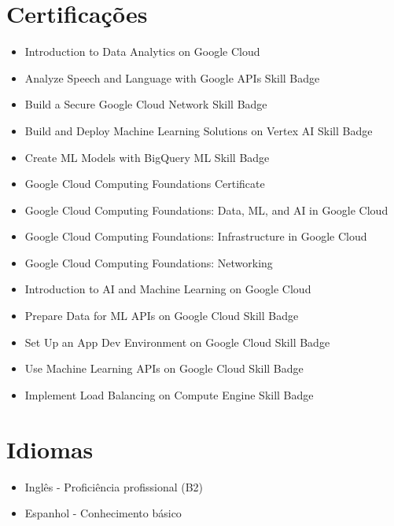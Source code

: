 \documentclass[letterpaper,11pt]{article}
\newcommand{\resumeItem}[1]{
  \item\small{
    {#1 \vspace{-2pt}}
  }
}
\newcommand{\resumeSubHeadingListStart}{\begin{itemize}[leftmargin=0.0in, label={}]}
\newcommand{\resumeSubHeadingListEnd}{\end{itemize}}
\begin{document}
\section{Certificações}
  \resumeSubHeadingListStart
    \resumeItem{Introduction to Data Analytics on Google Cloud}
    \resumeItem{Analyze Speech and Language with Google APIs Skill Badge}
    \resumeItem{Build a Secure Google Cloud Network Skill Badge}
    \resumeItem{Build and Deploy Machine Learning Solutions on Vertex AI Skill Badge}
    \resumeItem{Create ML Models with BigQuery ML Skill Badge}
    \resumeItem{Google Cloud Computing Foundations Certificate}
    \resumeItem{Google Cloud Computing Foundations: Data, ML, and AI in Google Cloud}
    \resumeItem{Google Cloud Computing Foundations: Infrastructure in Google Cloud}
    \resumeItem{Google Cloud Computing Foundations: Networking }
    \resumeItem{Introduction to AI and Machine Learning on Google Cloud}
    \resumeItem{Prepare Data for ML APIs on Google Cloud Skill Badge}
    \resumeItem{Set Up an App Dev Environment on Google Cloud Skill Badge}
    \resumeItem{Use Machine Learning APIs on Google Cloud Skill Badge}
    \resumeItem{Implement Load Balancing on Compute Engine Skill Badge}
  \resumeSubHeadingListEnd
\vspace{-16pt}

\section{Idiomas}
  \resumeSubHeadingListStart
    \resumeItem{Inglês - Proficiência profissional (B2)}
    \resumeItem{Espanhol - Conhecimento básico}
  \resumeSubHeadingListEnd
\vspace{-16pt}
\end{document}
